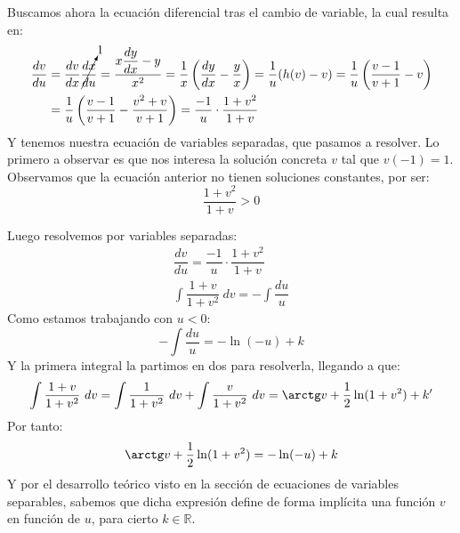 \begin{ejemplo}
\noindent
Buscamos ahora la ecuación diferencial tras el cambio de variable, la cual resulta en:
\begin{align*}
    \dfrac{dv}{du} &= \dfrac{dv}{dx} \cancelto{1}{\dfrac{dx}{du}} = \dfrac{x\dfrac{dy}{dx}-y}{x^2} = \dfrac{1}{x} \left( \dfrac{dy}{dx} - \dfrac{y}{x} \right) = \dfrac{1}{u}(h(v)-v) = \dfrac{1}{u}\left(\dfrac{v-1}{v+1}-v\right) \\
                   &= \dfrac{1}{u}\left(\dfrac{v-1}{v+1}-\dfrac{v^2+v}{v+1}\right) = \dfrac{-1}{u}\cdot \dfrac{1+v^2}{1+v}
\end{align*}
Y tenemos nuestra ecuación de variables separadas, que pasamos a resolver. Lo primero a observar es que nos interesa la solución concreta $v$ tal que $v(-1)=1$.\\

 Observamos que la ecuación anterior no tienen soluciones constantes, por ser:
 \begin{equation*}
     \dfrac{1+v^2}{1+v} > 0
 \end{equation*}

 Luego resolvemos por variables separadas:
 \begin{gather*}
     \dfrac{dv}{du} = \dfrac{-1}{u}\cdot \dfrac{1+v^2}{1+v} \\
     \int \dfrac{1+v}{1+v^2}~dv = -\int \dfrac{du}{u}
 \end{gather*}
 Como estamos trabajando con $u<0$:
 \begin{equation*}
     -\int \dfrac{du}{u}= -\ln(-u) + k
 \end{equation*}
 Y la primera integral la partimos en dos para resolverla, llegando a que:
 \begin{equation*}
     \int \dfrac{1+v}{1+v^2}~dv = \int \dfrac{1}{1+v^2}~dv + \int \dfrac{v}{1+v^2}~dv   = \arctg v +\dfrac{1}{2}\ln(1+v^2) + k'
 \end{equation*}
 Por tanto:
 \begin{equation*}
     \arctg v + \dfrac{1}{2}\ln(1+v^2) = -\ln(-u) + k
 \end{equation*}
 Y por el desarrollo teórico visto en la sección de ecuaciones de variables separables, sabemos que dicha expresión define de forma implícita una función $v$ en función de $u$, para cierto $k\in \mathbb{R}$.


\end{ejemplo}
